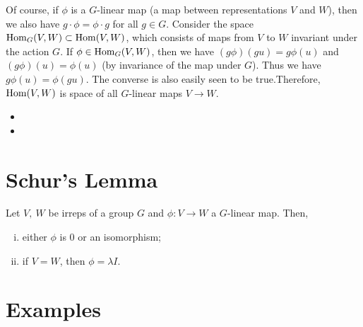 \begin{enumerate}[(a)]
\begin{center}
        \end{center}
        Of course, if $\phi$ is a $G$-linear map (a map between representations $V$ and $W$), then we also have $g\cdot\phi = \phi\cdot g$ for all $g\in G$. Consider the space $\operatorname{Hom}_G(V,W) \subset \operatorname{Hom}(V,W)$, which consists of maps from $V$ to $W$ invariant under the action $G$. If $\phi\in \operatorname{Hom}_G(V,W)$, then we have $(g\phi)(gu)=g\phi(u)$ and $(g\phi)(u)=\phi(u)$ (by invariance of the map under $G$). Thus we have $g\phi(u)=\phi(gu)$. The converse is also easily seen to be true.Therefore, $\operatorname{Hom}(V,W)$ is space of all $G$-linear maps $V\to W$.   

        
\end{enumerate}



\begin{itemize}
    \item {}
    \item {}
\end{itemize}

\section{Schur's Lemma}
\label{sec:schur_s_lemma}

\begin{lemma}
    Let $V,\ W$ be irreps of a group $G$ and $\phi: V\to W$ a $G$-linear map. Then,
    \begin{enumerate}[(i)]
        \item either $\phi$ is 0 or an isomorphism;
        \item if $V=W$, then $\phi=\lambda I$.
    \end{enumerate}
\end{lemma}

\section{Examples}
\label{sec:examples}

